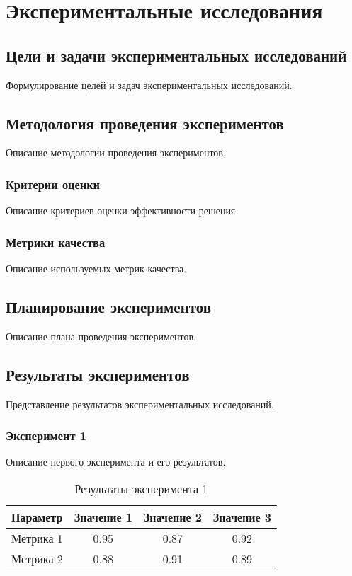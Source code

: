 \chapter{Экспериментальные исследования}

\section{Цели и задачи экспериментальных исследований}

Формулирование целей и задач экспериментальных исследований.

\section{Методология проведения экспериментов}

Описание методологии проведения экспериментов.

\subsection{Критерии оценки}

Описание критериев оценки эффективности решения.

\subsection{Метрики качества}

Описание используемых метрик качества.

\section{Планирование экспериментов}

Описание плана проведения экспериментов.

\section{Результаты экспериментов}

Представление результатов экспериментальных исследований.

\subsection{Эксперимент 1}

Описание первого эксперимента и его результатов.

\begin{table}[H]
\centering
\caption{Результаты эксперимента 1}
\begin{tabular}{|l|c|c|c|}
\hline
Параметр & Значение 1 & Значение 2 & Значение 3 \\
\hline
Метрика 1 & 0.95 & 0.87 & 0.92 \\
Метрика 2 & 0.88 & 0.91 & 0.89 \\
\hline
\end{tabular}
\label{tab:exp1}
\end{table}

